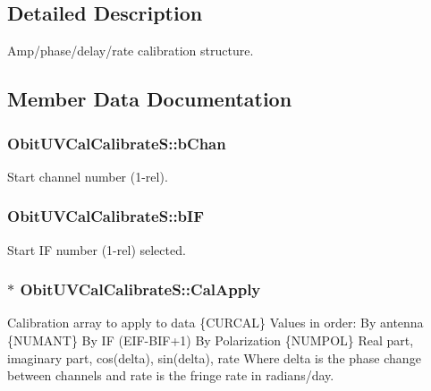 \subsection{Detailed Description}
Amp/phase/delay/rate calibration structure. 



\subsection{Member Data Documentation}
\subsubsection{ {\bf Obit\-UVCal\-Calibrate\-S::b\-Chan}}\label{structObitUVCalCalibrateS_o19}


Start channel number (1-rel). 

\subsubsection{ {\bf Obit\-UVCal\-Calibrate\-S::b\-IF}}\label{structObitUVCalCalibrateS_o16}


Start IF number (1-rel) selected. 

\subsubsection{$\ast$ {\bf Obit\-UVCal\-Calibrate\-S::Cal\-Apply}}\label{structObitUVCalCalibrateS_o61}


Calibration array to apply to data \{CURCAL\} Values in order: By antenna \{NUMANT\} By IF (EIF-BIF+1) By Polarization \{NUMPOL\} Real part, imaginary part, cos(delta), sin(delta), rate Where delta is the phase change between channels and rate is the fringe rate in radians/day. 


